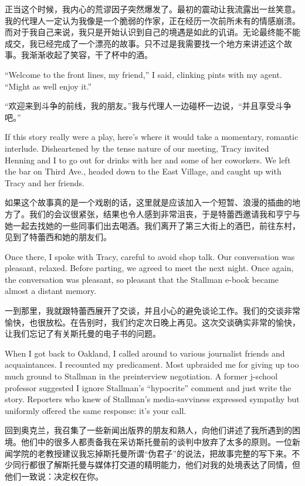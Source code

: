 \ifdefined\chs
正当这个时候，我内心的荒谬因子突然爆发了。最初的震动让我流露出一丝笑意。我的代理人一定认为我像是一个脆弱的作家，正在经历一次前所未有的情感崩溃。而对于我自己来说，我只是开始认识到自己的境遇是如此的讥诮。无论最终能不能成交，我已经完成了一个漂亮的故事。只不过是我需要找一个地方来讲述这个故事。我渐渐收起了笑容，干了杯中的酒。
\fi

\ifdefined\eng
``Welcome to the front lines, my friend,'' I said, clinking pints with my agent. ``Might as well enjoy it.''
\fi

\ifdefined\chs
``欢迎来到斗争的前线，我的朋友。''我与代理人一边碰杯一边说，``并且享受斗争吧。''
\fi

\ifdefined\eng
If this story really were a play, here's where it would take a momentary, romantic interlude. Disheartened by the tense nature of our meeting, Tracy invited Henning and I to go out for drinks with her and some of her coworkers. We left the bar on Third Ave., headed down to the East Village, and caught up with Tracy and her friends.
\fi

\ifdefined\chs
如果这个故事真的是一个戏剧的话，这里就是应该加入一个短暂、浪漫的插曲的地方了。我们的会议很紧张，结果也令人感到非常沮丧，于是特蕾西邀请我和亨宁与她一起去找她的一些同事们出去喝酒。我们离开了第三大街上的酒巴，前往东村，见到了特蕾西和她的朋友们。
\fi

\ifdefined\eng
Once there, I spoke with Tracy, careful to avoid shop talk. Our conversation was pleasant, relaxed. Before parting, we agreed to meet the next night. Once again, the conversation was pleasant, so pleasant that the Stallman e-book became almost a distant memory.
\fi

\ifdefined\chs
一到那里，我就跟特蕾西展开了交谈，并且小心的避免谈论工作。我们的交谈非常愉快，也很放松。在告别时，我们约定次日晚上再见。这次交谈确实非常的愉快，让我们忘记了有关斯托曼的电子书的问题。
\fi

\ifdefined\eng
When I got back to Oakland, I called around to various journalist friends and acquaintances. I recounted my predicament. Most upbraided me for giving up too much ground to Stallman in the preinterview negotiation. %
A former j-school professor suggested I ignore Stallman's ``hypocrite'' comment and just write the story. Reporters who knew of Stallman's media-savviness expressed sympathy but uniformly offered the same response: it's your call.
\fi

\ifdefined\chs
回到奥克兰，我召集了一些新闻出版界的朋友和熟人，向他们讲述了我所遇到的困境。他们中的很多人都责备我在采访斯托曼前的谈判中放弃了太多的原则。一位新闻学院的老教授建议我忘掉斯托曼所谓``伪君子''的说法，把故事完整的写下来。不少同行都很了解斯托曼与媒体打交道的精明能力，他们对我的处境表达了同情，但他们一致说：决定权在你。
\fi

